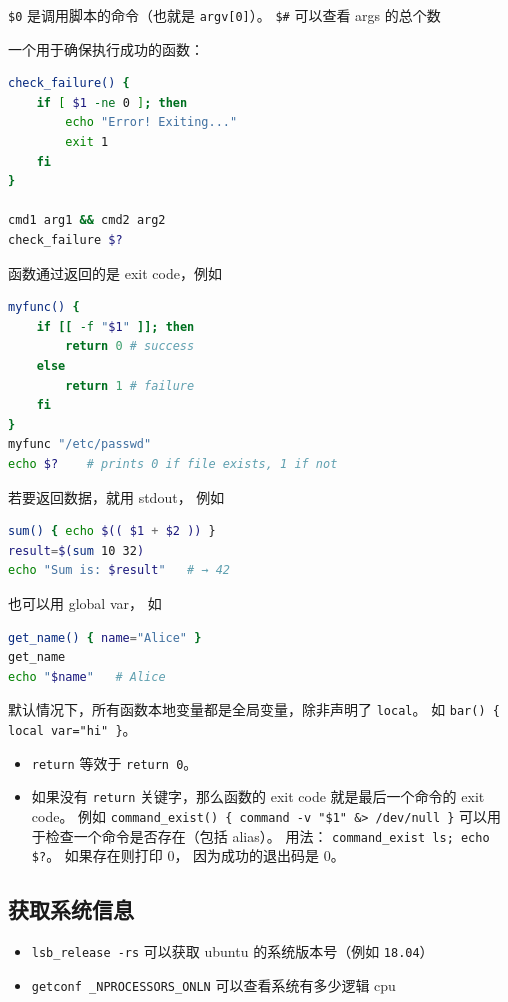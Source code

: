 \verb`$0` 是调用脚本的命令（也就是 \verb`argv[0]`）。 \verb`$#` 可以查看 args 的总个数

一个用于确保执行成功的函数：
\begin{lstlisting}[language=bash]
check_failure() {
    if [ $1 -ne 0 ]; then
        echo "Error! Exiting..."
        exit 1
    fi
}

cmd1 arg1 && cmd2 arg2
check_failure $?
\end{lstlisting}

函数通过返回的是 exit code，例如
\begin{lstlisting}[language=bash]
myfunc() {
    if [[ -f "$1" ]]; then
        return 0 # success
    else
        return 1 # failure
    fi
}
myfunc "/etc/passwd"
echo $?    # prints 0 if file exists, 1 if not
\end{lstlisting}

若要返回数据，就用 stdout， 例如
\begin{lstlisting}[language=bash]
sum() { echo $(( $1 + $2 )) }
result=$(sum 10 32)
echo "Sum is: $result"   # → 42
\end{lstlisting}

也可以用 global var， 如
\begin{lstlisting}[language=bash]
get_name() { name="Alice" }
get_name
echo "$name"   # Alice
\end{lstlisting}

默认情况下，所有函数本地变量都是全局变量，除非声明了 \verb`local`。 如 \verb`bar() { local var="hi" }`。

\begin{itemize}
\item \verb`return` 等效于 \verb`return 0`。
\item 如果没有 \verb`return` 关键字，那么函数的 exit code 就是最后一个命令的 exit code。 例如 \verb`command_exist() { command -v "$1" &> /dev/null }` 可以用于检查一个命令是否存在（包括 alias）。 用法： \verb`command_exist ls; echo $?`。 如果存在则打印 0， 因为成功的退出码是 0。
\end{itemize}


\subsection{获取系统信息}
\begin{itemize}
\item \verb`lsb_release -rs` 可以获取 ubuntu 的系统版本号（例如 \verb`18.04`）
\item \verb`getconf _NPROCESSORS_ONLN` 可以查看系统有多少逻辑 cpu
\end{itemize}
